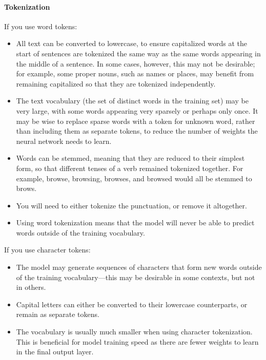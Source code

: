 \paragraph{Tokenization}

If you use word tokens:

\begin{itemize}
	\item  All text can be converted to lowercase, to ensure capitalized words at the start of sentences are tokenized the same way as the same words appearing in the middle of a sentence.
	      In some cases, however, this may not be desirable; for example, some proper nouns, such as names or places, may benefit from remaining capitalized so that they are tokenized independently.

	\item  The text vocabulary (the set of distinct words in the training set) may be very large, with some words appearing very sparsely or perhaps only once.
	      It may be wise to replace sparse words with a token for unknown word, rather than including them as separate tokens, to reduce the number of weights the neural network needs to learn.

	\item  Words can be stemmed, meaning that they are reduced to their simplest form, so that different tenses of a verb remained tokenized together.
	      For example, browse, browsing, browses, and browsed would all be stemmed to brows.

	\item  You will need to either tokenize the punctuation, or remove it altogether.
	\item  Using word tokenization means that the model will never be able to predict words outside of the training vocabulary.
\end{itemize}

If you use character tokens:

\begin{itemize}
	\item The model may generate sequences of characters that form new words outside of the training vocabulary—this may be desirable in some contexts, but not in others.

	\item Capital letters can either be converted to their lowercase counterparts, or remain as separate tokens.

	\item The vocabulary is usually much smaller when using character tokenization. This is beneficial for model training speed as there are fewer weights to learn in the final output layer.
\end{itemize}

